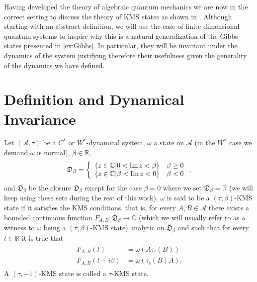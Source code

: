 Having developed the theory of algebraic quantum mechanics we are now in the correct setting to discuss the theory of KMS states as shown in \cite{Duvenhage1999}. Although starting with an abstract definition, we will use the case of finite dimensional quantum systems to inspire why this is a natural generalization of the Gibbs states presented in \ref{ex:Gibbs}. In particular, they will be invariant under the dynamics of the system justifying therefore their usefulness given the generality of the dynamics we have defined.

\section{Definition and Dynamical Invariance}

\begin{definition}\label{def:KMS}
Let $(\mathcal{A},\tau)$ be a $C^*$ or $W^*$-dynamical system, $\omega$ a state on $\mathcal{A}$ (in the $W^*$ case we demand $\omega$ is normal), $\beta\in\mathbb{R}$,
\begin{align}
\begin{split}
\mathfrak{D}_\beta=\left\{
\begin{array}{lr}
\{z\in\mathbb{C}|0<\operatorname{Im} z<\beta\} &\beta \geq 0 \\
\{z\in\mathbb{C}|\beta<\operatorname{Im} z<0\} &\beta < 0
\end{array}\right.,
\end{split}
\end{align}  
and $\overline{\mathfrak{D}_\beta}$ be the closure $\mathfrak{D}_\beta$ except for the case $\beta=0$ where we set $\overline{\mathfrak{D}_\beta}=\mathbb{R}$ (we will keep using these sets during the rest of this work). $\omega$ is said to be a $(\tau,\beta)$-KMS state if it satisfies the KMS conditions, that is, for every $A,B\in\mathcal{A}$ there exists a bounded continuous function $F_{A,B}:\overline{\mathfrak{D}_\beta}\rightarrow \mathbb{C}$ (which we will usually refer to as a witness to $\omega$ being a $(\tau,\beta)$-KMS state) analytic on $\mathfrak{D}_\beta$ and such that for every $t\in\mathbb{R}$ it is true that
\begin{align}
\begin{split}
F_{A,B}(t)&=\omega(A\tau_t(B)) \\
F_{A,B}(t+i\beta)&=\omega(\tau_t(B)A).
\end{split}
\end{align}
A $(\tau,-1)$-KMS state is called a $\tau$-KMS state.
\end{definition}

